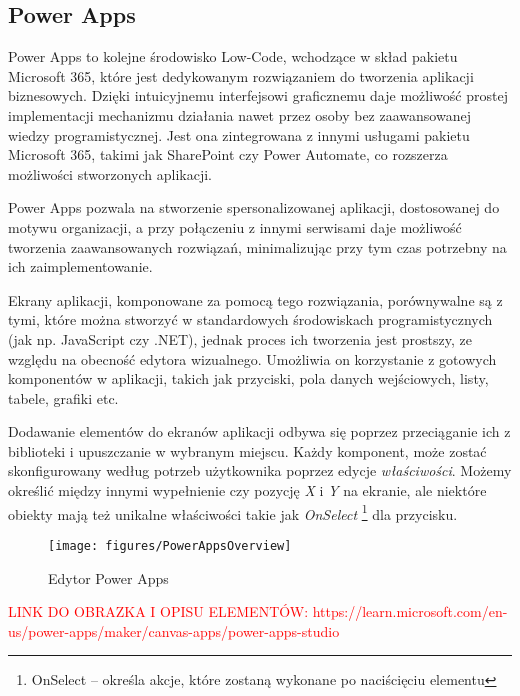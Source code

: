 \subsection{Power Apps}

Power Apps to kolejne środowisko Low-Code, wchodzące w skład pakietu Microsoft 365, które jest dedykowanym rozwiązaniem do tworzenia aplikacji biznesowych. Dzięki intuicyjnemu interfejsowi graficznemu daje możliwość prostej implementacji mechanizmu działania nawet przez osoby bez zaawansowanej wiedzy programistycznej. Jest ona zintegrowana z innymi usługami pakietu Microsoft 365, takimi jak SharePoint czy Power Automate, co rozszerza możliwości stworzonych aplikacji.

Power Apps pozwala na stworzenie spersonalizowanej aplikacji, dostosowanej do motywu organizacji, a przy połączeniu z innymi serwisami daje możliwość tworzenia zaawansowanych rozwiązań, minimalizując przy tym czas potrzebny na ich zaimplementowanie.

Ekrany aplikacji, komponowane za pomocą tego rozwiązania, porównywalne są z tymi, które można stworzyć w standardowych środowiskach programistycznych (jak np. JavaScript czy .NET), jednak proces ich tworzenia jest prostszy, ze względu na obecność edytora wizualnego. Umożliwia on korzystanie z gotowych komponentów w aplikacji, takich jak przyciski, pola danych wejściowych, listy, tabele, grafiki etc.

Dodawanie elementów do ekranów aplikacji odbywa się poprzez przeciąganie ich z biblioteki i upuszczanie w wybranym miejscu. Każdy komponent, może zostać skonfigurowany według potrzeb użytkownika poprzez edycje \emph{właściwości}. Możemy określić między innymi wypełnienie czy pozycję \emph{X} i \emph{Y} na ekranie, ale niektóre obiekty mają też unikalne właściwości takie jak \emph{OnSelect} \footnote{OnSelect -- określa akcje, które zostaną wykonane po naciścięciu elementu} dla przycisku.


\newpage

\begin{figure}[h] %
    \centering
    \texttt{[image: figures/PowerAppsOverview]}
    \caption{Edytor Power Apps}
    \label{fig:PowerAppsEditorOverview}
\end{figure}
\textcolor{red}{LINK DO OBRAZKA I OPISU ELEMENTÓW: https://learn.microsoft.com/en-us/power-apps/maker/canvas-apps/power-apps-studio}

